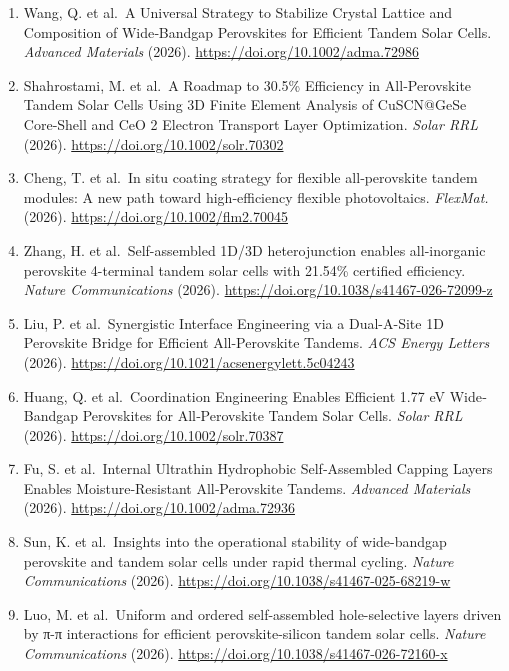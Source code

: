 \documentclass[
  11pt,
]{article}
\begin{document}
\begin{enumerate}
  Derivatives for Wide‐Bandgap Perovskite Solar Cells and Tandem
  Devices. \emph{Small} (2026). \url{https://doi.org/10.1002/smll.73595}
\item
  Wang, Q. et al.~A Universal Strategy to Stabilize Crystal Lattice and
  Composition of Wide‐Bandgap Perovskites for Efficient Tandem Solar
  Cells. \emph{Advanced Materials} (2026).
  \url{https://doi.org/10.1002/adma.72986}
\item
  Shahrostami, M. et al.~A Roadmap to 30.5\% Efficiency in
  All‐Perovskite Tandem Solar Cells Using 3D Finite Element Analysis of
  CuSCN@GeSe Core‐Shell and CeO 2 Electron Transport Layer Optimization.
  \emph{Solar RRL} (2026). \url{https://doi.org/10.1002/solr.70302}
\item
  Cheng, T. et al.~In situ coating strategy for flexible all‐perovskite
  tandem modules: A new path toward high‐efficiency flexible
  photovoltaics. \emph{FlexMat.} (2026).
  \url{https://doi.org/10.1002/flm2.70045}
\item
  Zhang, H. et al.~Self-assembled 1D/3D heterojunction enables
  all-inorganic perovskite 4-terminal tandem solar cells with 21.54\%
  certified efficiency. \emph{Nature Communications} (2026).
  \url{https://doi.org/10.1038/s41467-026-72099-z}
\item
  Liu, P. et al.~Synergistic Interface Engineering via a Dual-A-Site 1D
  Perovskite Bridge for Efficient All-Perovskite Tandems. \emph{ACS
  Energy Letters} (2026).
  \url{https://doi.org/10.1021/acsenergylett.5c04243}
\item
  Huang, Q. et al.~Coordination Engineering Enables Efficient 1.77 eV
  Wide‐Bandgap Perovskites for All‐Perovskite Tandem Solar Cells.
  \emph{Solar RRL} (2026). \url{https://doi.org/10.1002/solr.70387}
\item
  Fu, S. et al.~Internal Ultrathin Hydrophobic Self‐Assembled Capping
  Layers Enables Moisture‐Resistant All‐Perovskite Tandems.
  \emph{Advanced Materials} (2026).
  \url{https://doi.org/10.1002/adma.72936}
\item
  Sun, K. et al.~Insights into the operational stability of wide-bandgap
  perovskite and tandem solar cells under rapid thermal cycling.
  \emph{Nature Communications} (2026).
  \url{https://doi.org/10.1038/s41467-025-68219-w}
\item
  Luo, M. et al.~Uniform and ordered self-assembled hole-selective
  layers driven by π-π interactions for efficient perovskite-silicon
  tandem solar cells. \emph{Nature Communications} (2026).
  \url{https://doi.org/10.1038/s41467-026-72160-x}

\end{enumerate}
\end{document}
